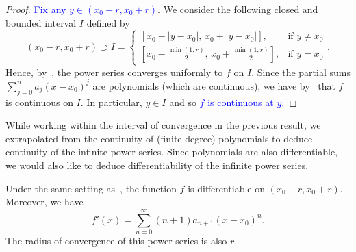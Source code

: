 \begin{proof}
	\textcolor{blue}{Fix any $y\in (x_0-r,x_0+r)$}. We consider the following closed and bounded interval $I$ defined by
	\[
	(x_0-r,x_0+r)\supset I = \left\{
	\begin{array}{cl}
		[x_0-|y-x_0|,\,x_0+|y-x_0|], 	&\text{if }y\neq x_0 	\\
		\left[x_0 - \frac{\min(1,r)}{2},\,x_0 + \frac{\min(1,r)}{2}\right], 	&\text{if }y = x_0
	\end{array}
	\right..
	\]
	Hence, by~, the power series converges uniformly to $f$ on $I$. Since the partial sums $\sum_{j=0}^n a_j (x-x_0)^j$ are polynomials (which are continuous), we have by~ that $f$ is continuous on $I$. In particular, $y\in I$ and so \textcolor{blue}{$f$ is continuous at $y$.}
\end{proof}
While working within the interval of convergence in the previous result, we extrapolated from the continuity of (finite degree) polynomials to deduce continuity of the infinite power series. Since polynomials are also differentiable, we would also like to deduce differentiability of the infinite power series.
\begin{cor}
	\label{cor:diff_power}
	Under the same setting as~, the function $f$ is differentiable on $(x_0 - r,x_0+r)$. Moreover, we have
	\[
	f'(x) = \sum_{n=0}^\infty (n+1)a_{n+1}(x-x_0)^n.
	\]
	The radius of convergence of this power series is also $r$.
\end{cor}
